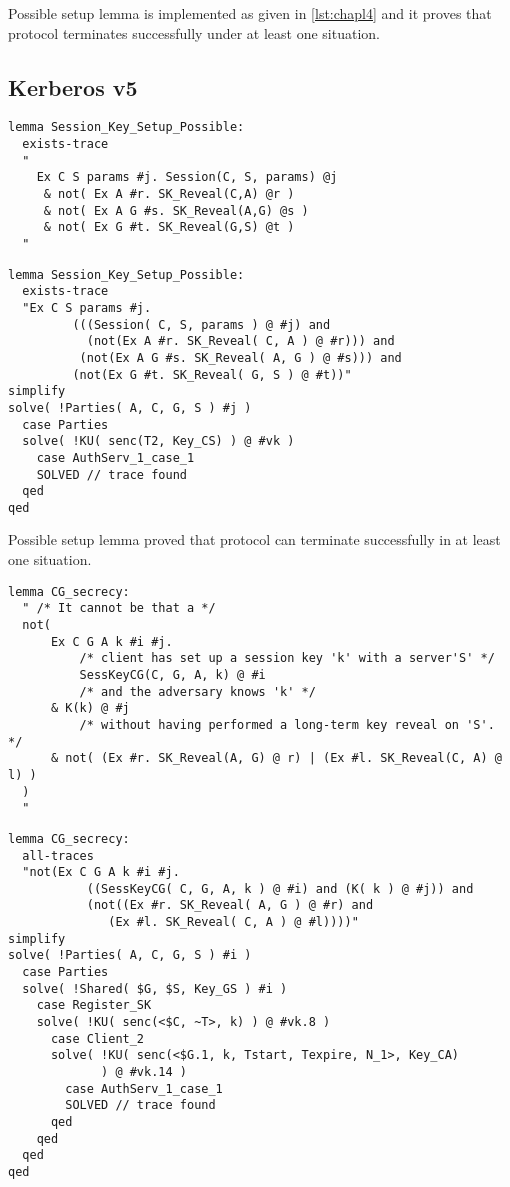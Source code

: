 \documentclass[a4paper, 12pt, titlepage]{article}
\begin{document}
Possible setup lemma is implemented as given in \ref{lst:chapl4} and it proves that protocol terminates successfully under at least one situation.
\subsection{Kerberos v5}
\begin{lstlisting}[caption = Implementation of possible setup lemma of Kerberos v5 protocol]
lemma Session_Key_Setup_Possible:
  exists-trace
  "
	Ex C S params #j. Session(C, S, params) @j
	 & not( Ex A #r. SK_Reveal(C,A) @r )
	 & not( Ex A G #s. SK_Reveal(A,G) @s )
	 & not( Ex G #t. SK_Reveal(G,S) @t )
  "
\end{lstlisting}
\begin{lstlisting}[caption = Execution results are positive for possible setup lemma of Kerberos v5 protocol]
lemma Session_Key_Setup_Possible:
  exists-trace
  "Ex C S params #j.
         (((Session( C, S, params ) @ #j) and
           (not(Ex A #r. SK_Reveal( C, A ) @ #r))) and
          (not(Ex A G #s. SK_Reveal( A, G ) @ #s))) and
         (not(Ex G #t. SK_Reveal( G, S ) @ #t))"
simplify
solve( !Parties( A, C, G, S ) #j )
  case Parties
  solve( !KU( senc(T2, Key_CS) ) @ #vk )
    case AuthServ_1_case_1
    SOLVED // trace found
  qed
qed
\end{lstlisting}
Possible setup lemma proved that protocol can terminate successfully in at least one situation.
\begin{lstlisting}[caption = Implementation of session key CG secrecy lemma of Kerberos v5 protocol]
lemma CG_secrecy:
  " /* It cannot be that a */
  not(
	  Ex C G A k #i #j.
		  /* client has set up a session key 'k' with a server'S' */
		  SessKeyCG(C, G, A, k) @ #i
		  /* and the adversary knows 'k' */
	  & K(k) @ #j
		  /* without having performed a long-term key reveal on 'S'. */
	  & not( (Ex #r. SK_Reveal(A, G) @ r) | (Ex #l. SK_Reveal(C, A) @ l) )
  )
  "
\end{lstlisting}
\begin{lstlisting}[caption = Execution results are negative for session key CG secrecy lemma of Kerberos v5 protocol , label ={lst:kerb2}]
lemma CG_secrecy:
  all-traces
  "not(Ex C G A k #i #j.
           ((SessKeyCG( C, G, A, k ) @ #i) and (K( k ) @ #j)) and
           (not((Ex #r. SK_Reveal( A, G ) @ #r) and
              (Ex #l. SK_Reveal( C, A ) @ #l))))"
simplify
solve( !Parties( A, C, G, S ) #i )
  case Parties
  solve( !Shared( $G, $S, Key_GS ) #i )
    case Register_SK
    solve( !KU( senc(<$C, ~T>, k) ) @ #vk.8 )
      case Client_2
      solve( !KU( senc(<$G.1, k, Tstart, Texpire, N_1>, Key_CA)
             ) @ #vk.14 )
        case AuthServ_1_case_1
        SOLVED // trace found
      qed
    qed
  qed
qed
\end{lstlisting}
\end{document}
